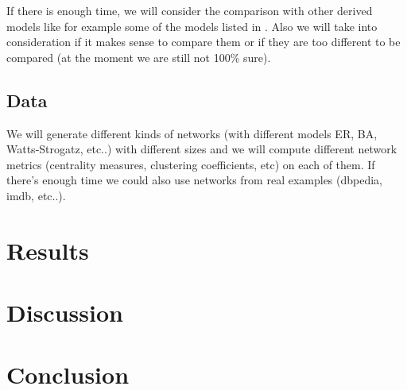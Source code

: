 \documentclass[a4paper]{article}
\begin{document}
If there is enough time, we will consider the comparison with other derived models like for example some of the models listed in . Also we will take into consideration if it makes sense to compare them or if they are too different to be compared (at the moment we are still not 100\% sure).

\subsection{Data}
We will generate different kinds of networks (with different models ER, BA, Watts-Strogatz, etc..) with different sizes and we will compute different network metrics (centrality measures, clustering coefficients, etc) on each of them. If there's enough time we could also use networks from real examples (dbpedia, imdb, etc..).



\section{Results}


\section{Discussion}

\section{Conclusion}
\end{document}
